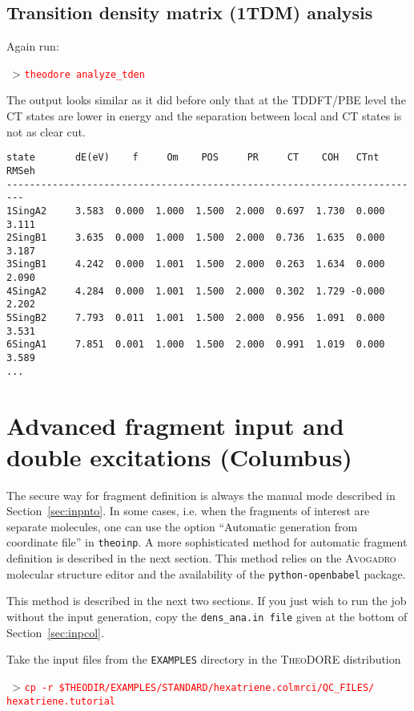 \documentclass[DIV=12,headings=normal]{scrartcl}
\newcommand{\redl}[1]{{\textcolor{red}{\texttt{#1}}}}
\newcommand{\comm}[1]{
\small
~> \redl{#1}
\normalsize
}
\newcommand{\theo}{\textsc{TheoDORE}}
\begin{document}
\subsection{Transition density matrix (1TDM) analysis}
Again run:

\comm{theodore analyze\_tden}

The output looks similar as it did before only that at the TDDFT/PBE level the CT states are lower in energy and the separation between local and CT states is not as clear cut.

\scriptsize
\begin{Verbatim}[commandchars=\\\{\}]
state       dE(eV)    f     Om    POS     PR     CT    COH   CTnt  RMSeh
-------------------------------------------------------------------------
1SingA2     3.583  0.000  1.000  1.500  2.000  0.697  1.730  0.000  3.111
2SingB1     3.635  0.000  1.000  1.500  2.000  0.736  1.635  0.000  3.187
3SingB1     4.242  0.000  1.001  1.500  2.000  0.263  1.634  0.000  2.090
4SingA2     4.284  0.000  1.001  1.500  2.000  0.302  1.729 -0.000  2.202
5SingB2     7.793  0.011  1.001  1.500  2.000  0.956  1.091  0.000  3.531
6SingA1     7.851  0.001  1.000  1.500  2.000  0.991  1.019  0.000  3.589
...
\end{Verbatim}
\normalsize


\section{Advanced fragment input and double excitations (Columbus)}
\label{sec:advinp}

The secure way for fragment definition is always the manual mode described in Section~\ref{sec:inpnto}.
In some cases, i.e. when the fragments of interest are separate molecules, one can use the option ``Automatic generation from coordinate file'' in \texttt{theoinp}.
A more sophisticated method for automatic fragment definition is described in the next section.
This method relies on the \textsc{Avogadro} molecular structure editor and the availability of the \texttt{python-openbabel} package.

This method is described in the next two sections.
If you just wish to run the job without the input generation, copy the \texttt{dens\_ana.in file} given at the bottom of Section~\ref{sec:inpcol}.

Take the input files from the \texttt{EXAMPLES} directory in the \theo{} distribution

\comm{cp -r \$THEODIR/EXAMPLES/STANDARD/hexatriene.colmrci/QC\_FILES/ hexatriene.tutorial} \\
\end{document}
